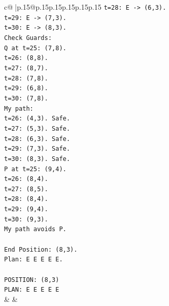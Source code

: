 \documentclass{article}
\begin{document}
{\begin{supertabular}{c@{$\;$}|p{.15\linewidth}@{}p{.15\linewidth}p{.15\linewidth}p{.15\linewidth}p{.15\linewidth}p{.15\linewidth}}
{{{\texttt{t=28: E {-}> (6,3).} \\
\texttt{t=29: E {-}> (7,3).} \\
\texttt{t=30: E {-}> (8,3).} \\
\texttt{Check Guards:} \\
\texttt{Q at t=25: (7,8).} \\
\texttt{t=26: (8,8).} \\
\texttt{t=27: (8,7).} \\
\texttt{t=28: (7,8).} \\
\texttt{t=29: (6,8).} \\
\texttt{t=30: (7,8).} \\
\texttt{My path:} \\
\texttt{t=26: (4,3). Safe.} \\
\texttt{t=27: (5,3). Safe.} \\
\texttt{t=28: (6,3). Safe.} \\
\texttt{t=29: (7,3). Safe.} \\
\texttt{t=30: (8,3). Safe.} \\
\texttt{P at t=25: (9,4).} \\
\texttt{t=26: (8,4).} \\
\texttt{t=27: (8,5).} \\
\texttt{t=28: (8,4).} \\
\texttt{t=29: (9,4).} \\
\texttt{t=30: (9,3).} \\
\texttt{My path avoids P.} \\
\\ 
\texttt{End Position: (8,3).} \\
\texttt{Plan: E E E E E.} \\
\\ 
\texttt{POSITION: (8,3)} \\
\texttt{PLAN: E E E E E} \\
            }
        }
    }
    & & \\ \\


\end{supertabular}}
\end{document}
